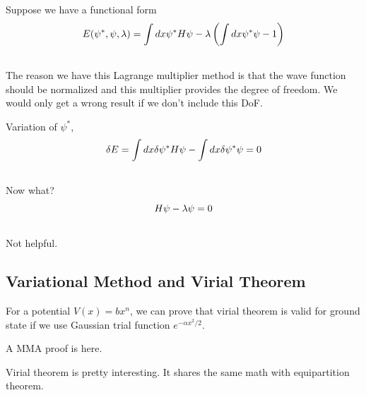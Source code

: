 \documentclass[letterpaper,10pt,english]{sphinxmanual}
\begin{document}
Suppose we have a functional form
\begin{gather}
\begin{split}E(\psi^*, \psi, \lambda) = \int dx \psi^* H \psi - \lambda \left( \int dx \psi^* \psi - 1 \right)\end{split}\notag\\\begin{split}\end{split}\notag
\end{gather}
The reason we have this Lagrange multiplier method is that the wave function should be normalized and this multiplier provides the degree of freedom. We would only get a wrong result if we don't include this DoF.

Variation of $\psi^*$,
\begin{gather}
\begin{split}\delta E = \int dx \delta \psi^* H \psi - \int dx \delta \psi^* \psi = 0\end{split}\notag\\\begin{split}\end{split}\notag
\end{gather}
Now what?
\begin{gather}
\begin{split}H \psi - \lambda \psi = 0\end{split}\notag\\\begin{split}\end{split}\notag
\end{gather}
Not helpful.


\subsection{Variational Method and Virial Theorem}
\label{approx:variational-method-and-virial-theorem}
For a potential $V(x)=b x^n$, we can prove that virial theorem is valid for ground state if we use Gaussian trial function $e^{- \alpha x^2/2}$.

A MMA proof is here.

Virial theorem is pretty interesting. It shares the same math with equipartition theorem.
\end{document}
